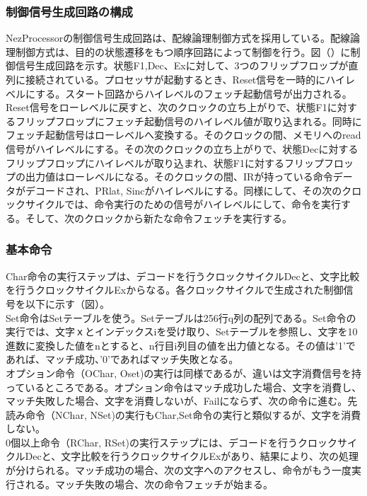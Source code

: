 \documentclass[paper]{ieicej}
\begin{document}
\subsubsection{制御信号生成回路の構成}
NezProcessorの制御信号生成回路は、配線論理制御方式を採用している。配線論理制御方式は、目的の状態遷移をもつ順序回路によって制御を行う。図（）に制御信号生成回路を示す。状態F1,Dec、Exに対して、3つのフリップフロップが直列に接続されている。プロセッサが起動するとき、Reset信号を一時的にハイレベルにする。スタート回路からハイレベルのフェッチ起動信号が出力される。Reset信号をローレベルに戻すと、次のクロックの立ち上がりで、状態F1に対するフリップフロップにフェッチ起動信号のハイレベル値が取り込まれる。同時にフェッチ起動信号はローレベルへ変換する。そのクロックの間、メモリへのread信号がハイレベルにする。その次のクロックの立ち上がりで、状態Decに対するフリップフロップにハイレベルが取り込まれ、状態F1に対するフリップフロップの出力値はローレベルになる。そのクロックの間、IRが持っている命令データがデコードされ、PRlat, Sincがハイレベルにする。同様にして、その次のクロックサイクルでは、命令実行のための信号がハイレベルにして、命令を実行する。そして、次のクロックから新たな命令フェッチを実行する。

\subsubsection{基本命令}

Char命令の実行ステップは、デコードを行うクロックサイクルDecと、文字比較を行うクロックサイクルExからなる。各クロックサイクルで生成された制御信号を以下に示す（図）。\\
Set命令はSetテーブルを使う。Setテーブルは256行q列の配列である。Set命令の実行では、文字ｘとインデックスiを受け取り、Setテーブルを参照し、文字を10進数に変換した値をnとすると、n行目i列目の値を出力値となる。その値は'1'であれば、マッチ成功、'0'であればマッチ失敗となる。\\

オプション命令（OChar, Oset)の実行は同様であるが、違いは文字消費信号を持っているところである。オプション命令はマッチ成功した場合、文字を消費し、マッチ失敗した場合、文字を消費しないが、Failにならず、次の命令に進む。先読み命令（NChar, NSet)の実行もChar,Set命令の実行と類似するが、文字を消費しない。\\

0個以上命令（RChar, RSet)の実行ステップには、デコードを行うクロックサイクルDecと、文字比較を行うクロックサイクルExがあり、結果により、次の処理が分けられる。マッチ成功の場合、次の文字へのアクセスし、命令がもう一度実行される。マッチ失敗の場合、次の命令フェッチが始まる。\\
\end{document}
